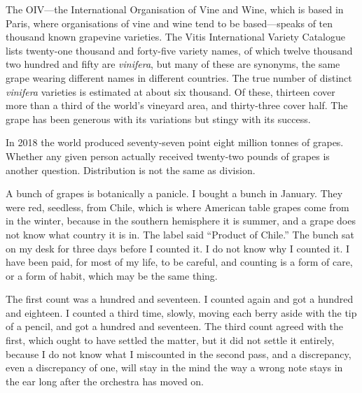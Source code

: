 The OIV---the International Organisation of Vine and
Wine, which is based in Paris, where organisations of vine and wine tend to
be based---speaks of ten thousand known grapevine varieties. The Vitis
International Variety Catalogue lists twenty-one thousand and forty-five
variety names, of which twelve thousand two hundred and fifty are
\textit{vinifera}, but many of these are synonyms, the same grape wearing
different names in different countries. The true number of distinct
\textit{vinifera} varieties is estimated at about six thousand. Of these,
thirteen cover more than a third of the world's vineyard area, and
thirty-three cover half. The grape has been generous with its variations
but stingy with its success.

In 2018 the world produced seventy-seven point eight million tonnes of
grapes. Whether any given
person actually received twenty-two pounds of grapes is another question.
Distribution is not the same as division.

A bunch of grapes is botanically a panicle. I bought
a bunch in January. They were red, seedless, from Chile, which is where
American table grapes come from in the winter, because in the southern
hemisphere it is summer, and a grape does not know what country it is in.
The label said ``Product of Chile.'' The bunch sat on my desk for three
days before I counted it. I do not know why I counted it. I have been
paid, for most of my life, to be careful, and counting is a form of care,
or a form of habit, which may be the same thing.

The first count was a hundred and seventeen. I counted again and got a
hundred and eighteen. I counted a third time, slowly, moving each berry
aside with the tip of a pencil, and got a hundred and seventeen. The third
count agreed with the first, which ought to have settled the matter, but it
did not settle it entirely, because I do not know what I miscounted in the
second pass, and a discrepancy, even a discrepancy of one, will stay in
the mind the way a wrong note stays in the ear long after the orchestra
has moved on.

